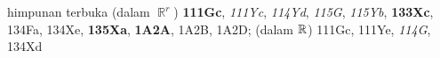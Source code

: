 himpunan terbuka (dalam $\BbbR^r$) {\bf 111Gc}, {\it 111Yc}, {\it 114Yd}, {\it 115G},
{\it 115Yb}, {\bf 133Xc}, 134Fa, 134Xe,
{\bf 135Xa}, {\bf 1A2A}, 1A2B, 1A2D;
  (dalam $\Bbb R$) 111Gc, 111Ye, {\it 114G}, 134Xd



















































































































































